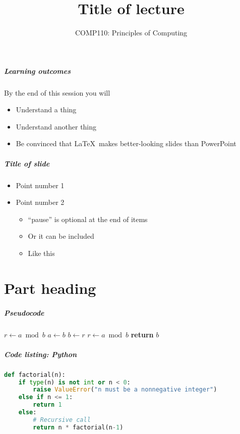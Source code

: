 \documentclass[xcolor={dvipsnames}]{beamer}\usepackage{etoolbox}\newtoggle{printable}\togglefalse{printable}
\begin{document}
\title{Title of lecture}   
\subtitle{COMP110: Principles of Computing}

\frame{\titlepage} 

\begin{frame}
	\frametitle{Learning outcomes}
	By the end of this session you will
	\begin{itemize}
		\item Understand a thing
		\item Understand another thing
		\item Be convinced that \LaTeX\ makes better-looking slides than PowerPoint
	\end{itemize}
\end{frame}

\begin{frame}
	\frametitle{Title of slide}
	\begin{itemize}
		\item Point number 1 \pause
		\item Point number 2 \pause
		\begin{itemize}
			\item ``pause'' is optional at the end of items
			\item Or it can be included \pause
			\item Like this
		\end{itemize}
	\end{itemize}
\end{frame}

\part{Part heading}
\frame{\partpage}

\begin{frame}
	\frametitle{Pseudocode}
	\begin{algorithmic}
			\State $r\gets a\bmod b$
				\State $a\gets b$
				\State $b\gets r$
				\State $r\gets a\bmod b$
			\EndWhile\label{euclidendwhile}
			\State \textbf{return} $b$
		\EndProcedure
	\end{algorithmic}
\end{frame}


\begin{frame}[fragile]
	\frametitle{Code listing: Python}
	\begin{lstlisting}[language=Python]
def factorial(n):
    if type(n) is not int or n < 0:
        raise ValueError("n must be a nonnegative integer")
    else if n <= 1:
        return 1
    else:
        # Recursive call
        return n * factorial(n-1)
	\end{lstlisting}
\end{frame}
\end{document}
